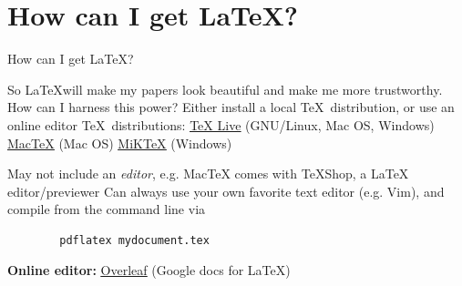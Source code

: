 \documentclass[10pt]{beamer}
\begin{document}
\section{How can I get \LaTeX?}
\begin{frame}[fragile]{How can I get \LaTeX?}

	\bi So \LaTeX will make my papers look beautiful and make me more trustworthy. How can I harness this power? \ei
	\bi Either install a \alert{local \TeX \, distribution}, or use an \alert{online editor} \ei
	\bi \TeX \, distributions:
	\bi \href{http://www.tug.org/texlive/}{\underline{\TeX{} Live}} (GNU/Linux, Mac OS, Windows) \ei
	\bi \href{http://tug.org/mactex/}{\underline{Mac\TeX}} (Mac OS) \ei
	\bi \href{https://miktex.org/}{\underline{MiK\TeX}} (Windows) \ei \ei
	
	\bi May not include an \textit{editor}, e.g. Mac\TeX{} comes with \TeX Shop, a \LaTeX \, editor/previewer
	\bi Can always use your own favorite text editor (e.g. Vim), and compile from the command line via \ei \ei
	\begin{verbatim}
		pdflatex mydocument.tex
	\end{verbatim}
	\bi \textbf{Online editor:} \href{https://www.overleaf.com/}{\underline{Overleaf}} (Google docs for \LaTeX) \ei

\end{frame}
\end{document}
